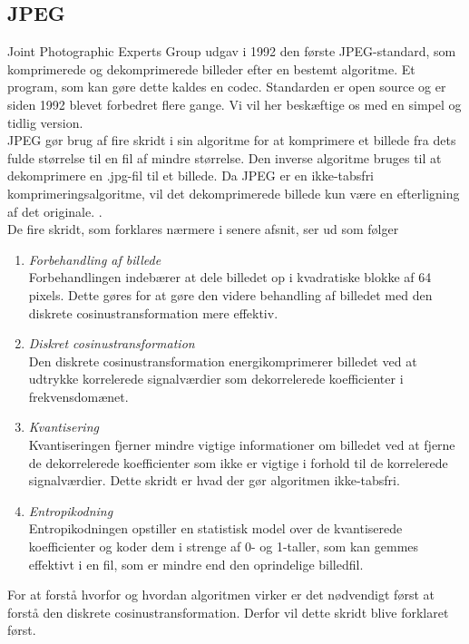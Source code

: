 \subsection{JPEG}
Joint Photographic Experts Group udgav i 1992 den første JPEG-standard, som komprimerede og dekomprimerede billeder efter en bestemt algoritme. Et program, som kan gøre dette kaldes en codec. Standarden er open source og er siden 1992 blevet forbedret flere gange. Vi vil her beskæftige os med en simpel og tidlig version.\\
JPEG gør brug af fire skridt i sin algoritme for at komprimere et billede fra dets fulde størrelse til en fil af mindre størrelse. Den inverse algoritme bruges til at dekomprimere en .jpg-fil til et billede. Da JPEG er en ikke-tabsfri komprimeringsalgoritme, vil det dekomprimerede billede kun være en efterligning af det originale. \citep{whydomath_basic}.\\
De fire skridt, som forklares nærmere i senere afsnit, ser ud som følger
\begin{enumerate}
\item \textit{Forbehandling af billede}\\
	Forbehandlingen indebærer at dele billedet op i kvadratiske blokke af 64 pixels. Dette gøres for at gøre den videre behandling af billedet med den diskrete cosinustransformation mere effektiv.
\item \textit{Diskret cosinustransformation}\\
	Den diskrete cosinustransformation energikomprimerer billedet ved at udtrykke korrelerede signalværdier som dekorrelerede koefficienter i frekvensdomænet.
\item \textit{Kvantisering}\\
	Kvantiseringen fjerner mindre vigtige informationer om billedet ved at fjerne de dekorrelerede koefficienter som ikke er vigtige i forhold til de korrelerede signalværdier. Dette skridt er hvad der gør algoritmen ikke-tabsfri.
\item \textit{Entropikodning}\\
	Entropikodningen opstiller en statistisk model over de kvantiserede koefficienter og koder dem i strenge af 0- og 1-taller, som kan gemmes effektivt i en fil, som er mindre end den oprindelige billedfil.
\end{enumerate}
For at forstå hvorfor og hvordan algoritmen virker er det nødvendigt først at forstå den diskrete cosinustransformation. Derfor vil dette skridt blive forklaret først.

